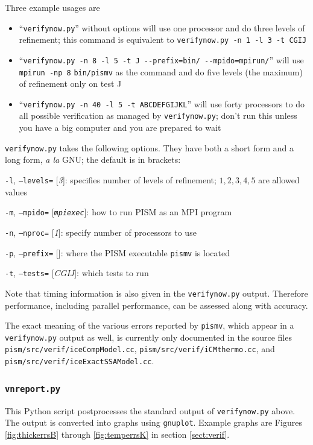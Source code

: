 \documentclass[11pt,final]{amsart}
\newcommand{\optoptdef}[3]{\vspace{1mm}\noindent \large\texttt{-#1},\,\,\texttt{--#2=}\normalsize\,\,[\textsl{#3}]:\quad}
\begin{document}
Three example usages are \begin{itemize}
\item ``\verb|verifynow.py|'' without options will use one processor and do three levels of refinement; this command is equivalent to \verb|verifynow.py -n 1 -l 3 -t CGIJ|
\item ``\verb|verifynow.py -n 8 -l 5 -t J --prefix=bin/ --mpido=mpirun/|'' will use \verb|mpirun -np 8| \verb|bin/pismv| as the command and do five levels (the maximum) of refinement only on test J
\item ``\verb|verifynow.py -n 40 -l 5 -t ABCDEFGIJKL|'' will use forty processors to do all possible verification as managed by \verb|verifynow.py|; don't run this unless you have a big computer and you are prepared to wait
\end{itemize}

\verb|verifynow.py| takes the following options.  They have both a short form and a long form, \emph{a la} GNU; the default is in brackets:

\optoptdef{l}{levels}{3} specifies number of levels of refinement; $1,2,3,4,5$ are allowed values

\optoptdef{m}{mpido}{\texttt{mpiexec}} how to run PISM as an MPI program

\optoptdef{n}{nproc}{1} specify number of processors to use

\optoptdef{p}{prefix}{} where the PISM executable \verb|pismv| is located

\optoptdef{t}{tests}{CGIJ} which tests to run

\medskip
Note that timing information is also given in the \verb|verifynow.py| output.  Therefore performance, including parallel performance, can be assessed along with accuracy.

The exact meaning of the various errors reported by \verb|pismv|, which appear in a \verb|verifynow.py| output as well, is currently only documented in the source files \verb|pism/src/verif/iceCompModel.cc|, \verb|pism/src/verif/iCMthermo.cc|, and \verb|pism/src/verif/iceExactSSAModel.cc|.  


\subsubsection*{\Large{\texttt{vnreport.py}}}  This Python script postprocesses the standard output of \verb|verifynow.py| above.  The output is converted into graphs using \verb|gnuplot|.  Example graphs are Figures \ref{fig:thickerrsB} through \ref{fig:temperrsK} in section \ref{sect:verif}.
\end{document}
